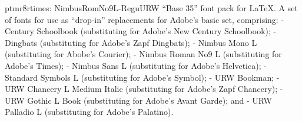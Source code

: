 \documentclass{ddltxtyp}
\begin{document}
\begin{package}{ptmr8r}{times: NimbusRomNo9L-Regu}{URW ``Base 35'' font pack for {\LaTeX}.}
A set of fonts for use as ``drop-in'' replacements for Adobe's
basic set, comprising: - Century Schoolbook (substituting for
Adobe's New Century Schoolbook); - Dingbats (substituting for
Adobe's Zapf Dingbats); - Nimbus Mono L (substituting for
Abobe's Courier); - Nimbus Roman No9 L (substituting for
Adobe's Times); - Nimbus Sans L (substituting for Adobe's
Helvetica); - Standard Symbols L (substituting for Adobe's
Symbol); - URW Bookman; - URW Chancery L Medium Italic
(substituting for Adobe's Zapf Chancery); - URW Gothic L Book
(substituting for Adobe's Avant Garde); and - URW Palladio L
(substituting for Adobe's Palatino).
\end{package}
\end{document}

